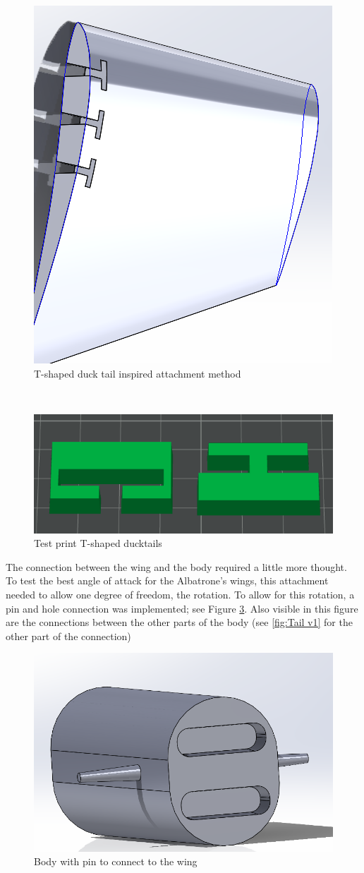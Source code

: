 \begin{figure}
    \centering
    \includegraphics[width=0.5\linewidth]{images/T ducktails.png}
    \caption{T-shaped duck tail inspired attachment method}
    \label{fig:T-ducktails}
\end{figure}\\

\begin{figure}
    \centering
    \includegraphics[width=0.5\linewidth]{images/Attachment test.png}
    \caption{Test print T-shaped ducktails}
    \label{fig:Attachment test}
\end{figure}

The connection between the wing and the body required a little more thought. To test the best angle of attack for the Albatrone's wings, this attachment needed to allow one degree of freedom, the rotation. To allow for this rotation, a pin and hole connection was implemented; see Figure \ref{fig:Body pin connection}. Also visible in this figure are the connections between the other parts of the body (see \ref{fig:Tail v1} for the other part of the connection)

\begin{figure}
    \centering
    \includegraphics[width=0.5\linewidth]{images/Body pin connection.png}
    \caption{Body with pin to connect to the wing}
    \label{fig:Body pin connection}
\end{figure}


